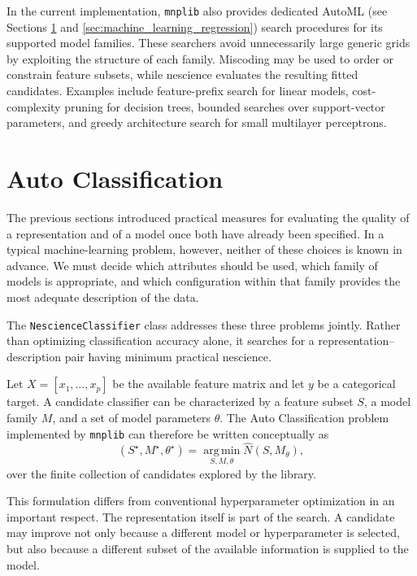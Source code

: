 In the current implementation, \texttt{mnplib} also provides dedicated AutoML (see Sections \ref{sec:machine_learning_classification} and \ref{sec:machine_learning_regression}) search procedures for its supported model families. These searchers avoid unnecessarily large generic grids by exploiting the structure of each family. Miscoding may be used to order or constrain feature subsets, while nescience evaluates the resulting fitted candidates. Examples include feature-prefix search for linear models, cost-complexity pruning for decision trees, bounded searches over support-vector parameters, and greedy architecture search for small multilayer perceptrons.

%
%

\section{Auto Classification}
\label{sec:machine_learning_classification}

The previous sections introduced practical measures for evaluating the quality of a representation and of a model once both have already been specified. In a typical machine-learning problem, however, neither of these choices is known in advance. We must decide which attributes should be used, which family of models is appropriate, and which configuration within that family provides the most adequate description of the data.

The \texttt{NescienceClassifier} class addresses these three problems jointly. Rather than optimizing classification accuracy alone, it searches for a representation--description pair having minimum practical nescience.

Let $X=[x_1,\ldots,x_p]$ be the available feature matrix and let $y$ be a categorical target. A candidate classifier can be characterized by a feature subset $S$, a model family $M$, and a set of model parameters $\theta$. The Auto Classification problem implemented by \texttt{mnplib} can therefore be written conceptually as
\[
(S^\star,M^\star,\theta^\star) = \operatorname*{arg\,min}_{S,M,\theta} \widehat N(S,M_\theta),
\]
over the finite collection of candidates explored by the library.

This formulation differs from conventional hyperparameter optimization in an important respect. The representation itself is part of the search. A candidate may improve not only because a different model or hyperparameter is selected, but also because a different subset of the available information is supplied to the model.

